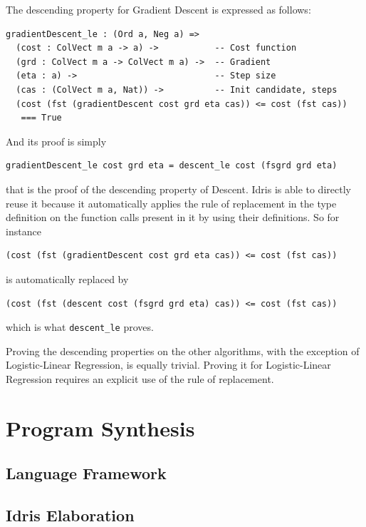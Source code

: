 \documentclass[]{report}
\begin{document}
The descending property for Gradient Descent is expressed as follows:
\begin{verbatim}
gradientDescent_le : (Ord a, Neg a) =>
  (cost : ColVect m a -> a) ->           -- Cost function
  (grd : ColVect m a -> ColVect m a) ->  -- Gradient
  (eta : a) ->                           -- Step size
  (cas : (ColVect m a, Nat)) ->          -- Init candidate, steps
  (cost (fst (gradientDescent cost grd eta cas)) <= cost (fst cas))
   === True
\end{verbatim}
And its proof is simply
\begin{verbatim}
gradientDescent_le cost grd eta = descent_le cost (fsgrd grd eta)
\end{verbatim}
that is the proof of the descending property of Descent. Idris is able
to directly reuse it because it automatically applies the rule of
replacement in the type definition on the function calls present in it
by using their definitions.  So for instance
\begin{verbatim}
(cost (fst (gradientDescent cost grd eta cas)) <= cost (fst cas))
\end{verbatim}
is automatically replaced by
\begin{verbatim}
(cost (fst (descent cost (fsgrd grd eta) cas)) <= cost (fst cas))
\end{verbatim}
which is what \texttt{descent\_le} proves.

Proving the descending properties on the other algorithms, with the
exception of Logistic-Linear Regression, is equally trivial.  Proving
it for Logistic-Linear Regression requires an explicit use of the rule
of replacement.

\chapter{Program Synthesis}
\label{chap:program_synthesis}

\section{Language Framework}

\section{Idris Elaboration}
\end{document}

